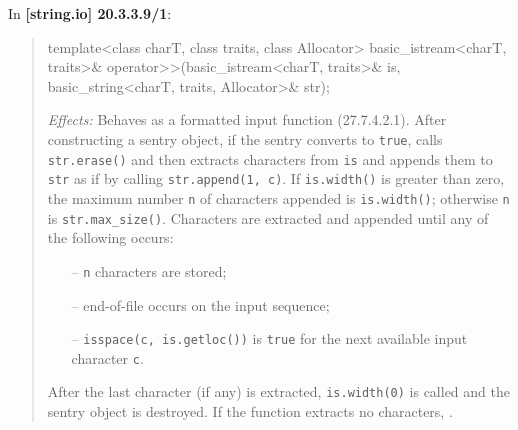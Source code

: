 \documentclass{wg21}
\begin{document}
In \textbf{[string.io] 20.3.3.9/1}:
\begin{quote}
\begin{codeblock}
template<class charT, class traits, class Allocator>
  basic_istream<charT, traits>&
    operator>>(basic_istream<charT, traits>& is, basic_string<charT, traits, Allocator>& str);
\end{codeblock}
\textit{Effects:} Behaves as a formatted input function (27.7.4.2.1). After
constructing a sentry object, if the sentry converts to \texttt{true}, calls
\texttt{str.erase()} and then extracts characters from \texttt{is} and appends
them to \texttt{str} as if by calling \texttt{str.append(1, c)}. If \texttt{is.width()}
is greater than zero, the maximum number \texttt{n} of characters appended is
\texttt{is.width()}; otherwise \texttt{n} is \texttt{str.max_size()}.
Characters are extracted and appended until any of the following occurs:
\begin{itemize}
  \item[--] \texttt{n} characters are stored;
  \item[--] end-of-file occurs on the input sequence;
  \item[--] \texttt{isspace(c, is.getloc())} is \texttt{true} for the next
            available input character \texttt{c}.
\end{itemize}
After the last character (if any) is extracted, \texttt{is.width(0)} is called
and the sentry object is destroyed. If the function extracts no characters,
.
\end{quote}
\end{document}
